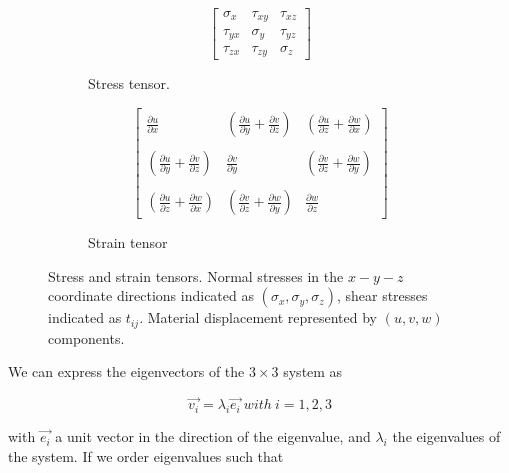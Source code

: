 \begin{figure}[htb]
	\begin{subfigure}[h]{0.48\linewidth}
		\LARGE
		\begin{equation*}
		\left[\begin{array}{ccc}
		\sigma{_x} & \tau{_{xy}} & \tau{_{xz}}  \\
		\tau{_{yx}} & \sigma{_y} & \tau{_{yz}}    \\
		\tau{_{zx}} & \tau{_{zy}} & \sigma{_z}
		\end{array}\right]
		\end{equation*}
		\caption{Stress tensor.}
		\label{fig:Figure6-20a}
	\end{subfigure}
	\hfill
	\begin{subfigure}[h]{0.48\linewidth}
		\LARGE
		\begin{equation*}
		\left[\begin{array}{ccc}
		\frac{\partial u}{\partial x} & (\frac{\partial u}{\partial y} + \frac{\partial v}{\partial z})&   (\frac{\partial u}{\partial z} + \frac{\partial w}{\partial x})\\ \\
		(\frac{\partial u}{\partial y} + \frac{\partial v}{\partial z}) & \frac{\partial v}{\partial y} & (\frac{\partial v}{\partial z} + \frac{\partial w}{\partial y})    \\ \\
		(\frac{\partial u}{\partial z} + \frac{\partial w}{\partial x}) & (\frac{\partial v}{\partial z} + \frac{\partial w}{\partial y})&
		\frac{\partial w}{\partial z}
		\end{array}\right]
		\end{equation*}
		\caption{Strain tensor}\label{fig:Figure6-20b}
	\end{subfigure}
	\caption{Stress and strain tensors. Normal stresses in the $x-y-z$ coordinate directions indicated as $(\sigma_x, \sigma_y, \sigma_z)$, shear stresses indicated as $t_{ij}$. Material displacement represented by $(u, v, w)$ components.}\label{fig:Figure6-20}
\end{figure}


We can express the eigenvectors of the $3 \times 3$ system as

\begin{equation}\label{eq:6.8}
\vec{v_i} = \lambda _i \vec{e_i} \ with\  i = 1,2,3
\end{equation}

with $\vec{e_i}$ a unit vector in the direction of the eigenvalue, and $\lambda{_i}$ the eigenvalues of the system. If we order eigenvalues such that

